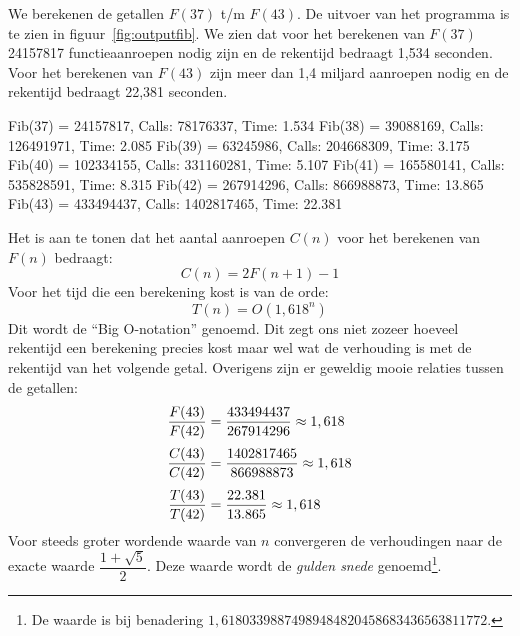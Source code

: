 
We berekenen de getallen $F(37)$ t/m $F(43)$. De uitvoer van het programma is te zien in figuur~\ref{fig:outputfib}. We zien dat voor het berekenen van $F(37)$ 24157817 functieaanroepen nodig zijn en de rekentijd bedraagt 1,534 seconden. Voor het berekenen van $F(43)$ zijn meer dan 1,4 miljard aanroepen nodig en de rekentijd bedraagt 22,381 seconden.

\begin{dosbox}[title=Uitvoer van een Fibonacci-programma.,label=fig:outputfib]
Fib(37) = 24157817, Calls: 78176337, Time: 1.534
Fib(38) = 39088169, Calls: 126491971, Time: 2.085
Fib(39) = 63245986, Calls: 204668309, Time: 3.175
Fib(40) = 102334155, Calls: 331160281, Time: 5.107
Fib(41) = 165580141, Calls: 535828591, Time: 8.315
Fib(42) = 267914296, Calls: 866988873, Time: 13.865
Fib(43) = 433494437, Calls: 1402817465, Time: 22.381
\end{dosbox}

Het is aan te tonen dat het aantal aanroepen $C(n)$ voor het berekenen van $F(n)$ bedraagt:
%
\begin{equation}
C(n) = 2F(n+1)-1
\end{equation}
%
Voor het tijd die een berekening kost is van de orde:
%
\begin{equation}
T(n) = O(1,618^n)
\end{equation}
%
Dit wordt de ``Big O-notation'' genoemd. Dit zegt ons niet zozeer hoeveel rekentijd een berekening precies kost maar wel wat de verhouding is met de rekentijd van het volgende getal. Overigens zijn er geweldig mooie relaties tussen de getallen:
%
\begin{equation}
\jot=5pt
\begin{split}
\dfrac{F(43)}{F(42)} &= \dfrac{433494437}{267914296}\approx 1,618\\
\dfrac{C(43)}{C(42)} &= \dfrac{1402817465}{866988873}\approx 1,618\\
\dfrac{T(43)}{T(42)} &= \dfrac{22.381}{13.865}\approx 1,618
\end{split}\end{equation}
%
Voor steeds groter wordende waarde van $n$ convergeren de verhoudingen naar de exacte waarde $\dfrac{1+\sqrt{5}}{2}$. Deze waarde wordt de \textsl{gulden snede} genoemd\footnote{De waarde is bij benadering $1,61803398874989484820458683436563811772$.}.
\basic


